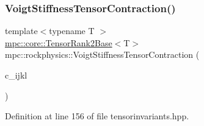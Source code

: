 \subsubsection{\texorpdfstring{Voigt\+Stiffness\+Tensor\+Contraction()}{VoigtStiffnessTensorContraction()}}
{\footnotesize\ttfamily template$<$typename T $>$ \\
\mbox{\hyperlink{structmpc_1_1core_1_1_tensor_rank2_base}{mpc\+::core\+::\+Tensor\+Rank2\+Base}}$<$T$>$ mpc\+::rockphysics\+::\+Voigt\+Stiffness\+Tensor\+Contraction (\begin{DoxyParamCaption}\item[{const \mbox{\hyperlink{structmpc_1_1core_1_1_stiffness_tensor}{mpc\+::core\+::\+Stiffness\+Tensor}}$<$ T $>$ \&}]{c\+\_\+ijkl }\end{DoxyParamCaption})}



Definition at line 156 of file tensorinvariants.\+hpp.


